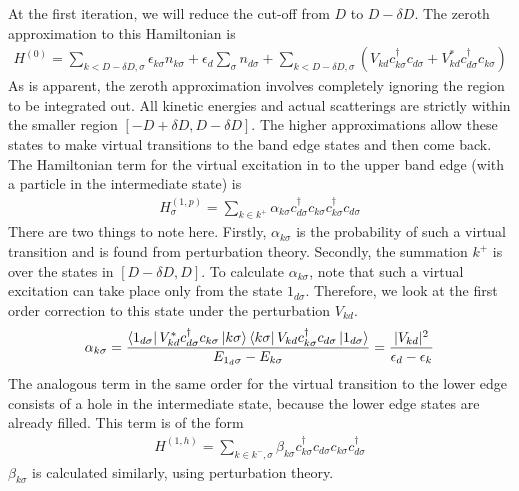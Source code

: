 \documentclass[twoside]{report}
\numberwithin{equation}{section}
\begin{document}
At the first iteration, we will reduce the cut-off from \(D\) to \(D - \delta D\).
The zeroth approximation to this Hamiltonian is
\begin{equation}\begin{aligned}
	H^{(0)} = \sum_{k<D-\delta D, \sigma} \epsilon_{k\sigma}n_{k\sigma} + \epsilon_d \sum_\sigma n_{d\sigma} + \sum_{k<D-\delta D,\sigma}\left(V_{kd} c^\dagger_{k\sigma}c_{d\sigma} + V^*_{kd}c^\dagger_{d\sigma}c_{k\sigma}\right)
\end{aligned}\end{equation}
As is apparent, the zeroth approximation involves completely ignoring the region to be integrated out.
All kinetic energies and actual scatterings are strictly within the smaller region \([-D + \delta D, D - \delta D]\).
The higher approximations  allow these states to make virtual transitions to the band edge states and then come back.
The Hamiltonian term for the virtual excitation in to the upper band edge (with a particle in the intermediate state) is
\begin{equation}\begin{aligned}
H^{(1,p)}_\sigma = \sum_{k\in k^+} \alpha_{k\sigma} c^\dagger_{d\sigma} c_{k\sigma}c^\dagger_{k\sigma} c_{d\sigma}
\end{aligned}\end{equation}
There are two things to note here.
Firstly, \(\alpha_{k\sigma}\) is the probability of such a virtual transition and is found from perturbation theory.
Secondly, the summation \(k^+\) is over the states in \([D-\delta D,D]\).
To calculate \(\alpha_{k\sigma}\), note that such a virtual excitation can take place only from the state \(1_{d\sigma}\).
Therefore, we look at the first order correction to this state under the perturbation \(V_{kd}\).
\begin{equation}\begin{aligned}
\alpha_{k\sigma} = \frac{\bra{1_{d\sigma}}V^*_{kd} c^\dagger_{d\sigma} c_{k\sigma}\ket{k\sigma}\bra{k\sigma}V_{kd}c^\dagger_{k\sigma} c_{d\sigma}\ket{1_{d\sigma}}}{E_{1_d\sigma} - E_{k\sigma}} = \frac{|V_{kd}|^2}{\epsilon_d - \epsilon_k}
\end{aligned}\end{equation}
The analogous term in the same order for the virtual transition to the lower edge consists of a hole in the intermediate state, because the lower edge states are already filled.
This term is of the form
\begin{equation}\begin{aligned}
H^{(1,h)} = \sum_{k\in k^-,\sigma} \beta_{k\sigma} c^\dagger_{k\sigma} c_{d\sigma} c_{k\sigma} c_{d\sigma}^\dagger
\end{aligned}\end{equation}
\(\beta_{k\sigma}\) is calculated similarly, using perturbation theory.
\end{document}
